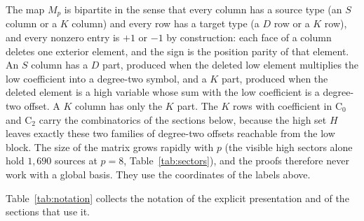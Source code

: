 \documentclass[11pt]{article}
\theoremstyle{definition}
\theoremstyle{remark}
\begin{document}
The map $M_p$ is bipartite in the sense that every column has a source type
(an $S$ column or a $K$ column) and every row has a target type (a $D$ row or a
$K$ row), and every nonzero entry is $+1$ or $-1$ by construction: each face of a
column deletes one exterior element, and the sign is the position parity of that
element. An $S$ column has a $D$ part, produced when the deleted low element
multiplies the low coefficient into a degree-two symbol, and a $K$ part,
produced when the deleted element is a high variable whose sum with the low
coefficient is a degree-two offset. A $K$ column has only the $K$ part. The $K$
rows with coefficient in $\mathrm C_0$ and $\mathrm C_2$ carry the combinatorics
of the sections below, because the high set $H$ leaves exactly these two
families of degree-two offsets reachable from the low block. The size of the
matrix grows rapidly with $p$ (the visible high sectors alone hold $1{,}690$
sources at $p=8$, Table~\ref{tab:sectors}), and the proofs therefore never work
with a global basis. They use the coordinates of the labels above.

Table~\ref{tab:notation} collects the notation of the explicit presentation and of the
sections that use it.
\end{document}
